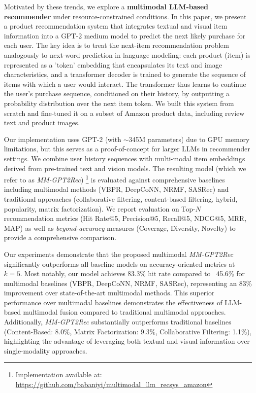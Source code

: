\documentclass[conference]{IEEEtran}
\begin{document}
Motivated by these trends, we explore a \textbf{multimodal LLM-based recommender} under resource-constrained conditions. In this paper, we present a product recommendation system  that integrates textual and visual item information into a GPT-2 medium model to predict the next likely purchase for each user. The key idea is to treat the next-item recommendation problem analogously to next-word prediction in language modeling: each product (item) is represented as a 'token' embedding that encapsulates its text and image characteristics, and a transformer decoder is trained to generate the sequence of items with which a user would interact. The transformer thus learns to continue the user’s purchase sequence, conditioned on their history, by outputting a probability distribution over the next item token. We built this system from scratch and fine-tuned it on a subset of Amazon product data, including review text and product images.


Our implementation uses GPT-2 (with $\sim$345M parameters) due to GPU memory limitations, but this serves as a proof-of-concept for larger LLMs in recommender settings. We combine user history sequences with multi-modal item embeddings derived from pre-trained text and vision models. The resulting model (which we refer to as \textit{MM-GPT2Rec}) \footnote{Implementation available at: \url{https://github.com/babaniyi/multimodal_llm_recsys_amazon}} is evaluated against comprehensive baselines including multimodal methods (VBPR, DeepCoNN, NRMF, SASRec) and traditional approaches (collaborative filtering, content-based filtering, hybrid, popularity, matrix factorization). We report evaluation on Top-$N$ recommendation metrics (Hit Rate@5, Precision@5, Recall@5, NDCG@5, MRR, MAP) as well as \textit{beyond-accuracy} measures (Coverage, Diversity, Novelty) to provide a comprehensive comparison.

Our experiments demonstrate that the proposed multimodal \textit{MM-GPT2Rec} significantly outperforms all baseline models on accuracy-oriented metrics at $k=5$. Most notably, our model achieves 83.3\% hit rate compared to ~45.6\% for multimodal baselines (VBPR, DeepCoNN, NRMF, SASRec), representing an 83\% improvement over state-of-the-art multimodal methods. This superior performance over multimodal baselines demonstrates the effectiveness of LLM-based multimodal fusion compared to traditional multimodal approaches. Additionally, \textit{MM-GPT2Rec} substantially outperforms traditional baselines (Content-Based: 8.0\%, Matrix Factorization: 9.3\%, Collaborative Filtering: 1.1\%), highlighting the advantage of leveraging both textual and visual information over single-modality approaches.
\end{document}
